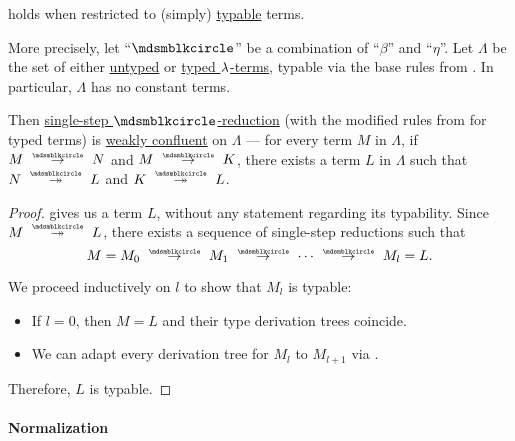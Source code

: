 \begin{proposition}\label{thm:simply_typed_church_rosser_theorem}
   holds when restricted to (simply) \hyperref[def:typability]{typable} terms.

  More precisely, let \enquote{\( {\Anon} \)} be a combination of \enquote{\( \beta \)} and \enquote{\( \eta \)}. Let \( \Lambda \) be the set of either \hyperref[def:lambda_term]{untyped} or \hyperref[def:typed_lambda_term]{typed \( \mathrm{\lambda} \)-terms}, typable via the base rules from . In particular, \( \Lambda \) has no constant terms.

  Then \hyperref[def:lambda_reduction/single]{single-step \( \Anon \)-reduction} (with the modified rules from  for typed terms) is \hyperref[def:reduction_confluence]{weakly confluent} on \( \Lambda \) --- for every term \( M \) in \( \Lambda \), if \( M \pred N \) and \( M \pred K \), there exists a term \( L \) in \( \Lambda \) such that \( N \pred* L \) and \( K \pred* L \).
\end{proposition}
\begin{proof}
   gives us a term \( L \), without any statement regarding its typability. Since \( M \pred* L \), there exists a sequence of single-step reductions such that
  \begin{equation*}
    M = M_0 \pred M_1 \pred \cdots \pred M_l = L.
  \end{equation*}

  We proceed inductively on \( l \) to show that \( M_l \) is typable:
  \begin{itemize}
    \item If \( l = 0 \), then \( M = L \) and their type derivation trees coincide.
    \item We can adapt every derivation tree for \( M_l \) to \( M_{l+1} \) via .
  \end{itemize}

  Therefore, \( L \) is typable.
\end{proof}

\paragraph{Normalization}

\begin{definition}\label{def:lambda_term_strong_normalization}
\end{definition}
